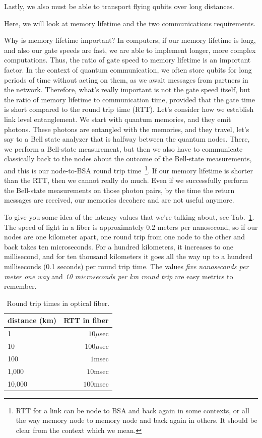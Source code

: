 Lastly, we also must be able to transport flying qubits over long distances.

Here, we will look at memory lifetime and the two communications requirements.

Why is memory lifetime important? In computers, if our memory lifetime is long, and also our gate speeds are fast, we are able to implement longer, more complex computations.  Thus, the ratio of gate speed to memory lifetime is an important factor. In the context of quantum communication, we often store qubits for long periods of time without acting on them, as we await messages from partners in the network.  Therefore, what's really important is not the gate speed itself, but the ratio of memory lifetime to communication time, 
provided that the gate time is short compared to the round trip time (RTT). Let's consider how we establish link level entanglement. We start with quantum memories, and they emit photons. These photons are entangled with the memories, and they travel, let's say to a Bell state analyzer that is halfway between the quantum nodes. There, we perform a Bell-state measurement, but then we also have to communicate classically back to the nodes about the outcome of the Bell-state measurements, and this is our node-to-BSA round trip time~\footnote{RTT for a link can be node to BSA and back again in some contexts, or all the way memory node to memory node and back again in others. It should be clear from the context which we mean.}. If our memory lifetime is shorter than the RTT, then we cannot really do much. Even if we successfully perform the Bell-state measurements on those photon pairs, by the time the return messages are received, our memories decohere and are not useful anymore.

To give you some idea of the latency values that we're talking about, see Tab.~\ref{tab:rtt}. The speed of light in a fiber is approximately $0.2$ meters per nanosecond,
so if our nodes are one kilometer apart, one round trip from one node to the other and back takes ten microseconds. For a hundred kilometers, it increases to one millisecond, and for ten thousand kilometers it goes all the way up to a hundred milliseconds (0.1 seconds) per round trip time.  The values \emph{five nanoseconds per meter one way} and \emph{10 microseconds per km round trip} are easy metrics to remember.

\begin{table}
\centering
\begin{tabular}{l|r}
distance (km)  & RTT in fiber \\\hline
1     & $10\mu$sec \\
10    & $100\mu$sec \\
100   & $1$msec \\
1,000 & $10$msec \\
10,000 & $100$msec
\end{tabular}
\caption{Round trip times in optical fiber.}
\label{tab:rtt}
\end{table}

